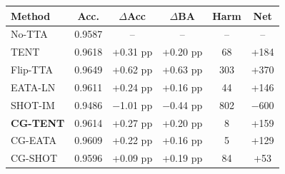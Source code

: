 \begin{tabular}{@{}lccccc@{}}
\toprule
Method & Acc. & $\Delta$Acc & $\Delta$BA & Harm & Net \\
\midrule
No-TTA & 0.9587 & -- & -- & -- & -- \\
TENT & 0.9618 & +0.31 pp & +0.20 pp & 68 & +184 \\
Flip-TTA & 0.9649 & +0.62 pp & +0.63 pp & 303 & +370 \\
EATA-LN & 0.9611 & +0.24 pp & +0.16 pp & 44 & +146 \\
SHOT-IM & 0.9486 & $-$1.01 pp & $-$0.44 pp & 802 & $-$600 \\
\textbf{CG-TENT} & 0.9614 & +0.27 pp & +0.20 pp & 8 & +159 \\
CG-EATA & 0.9609 & +0.22 pp & +0.16 pp & 5 & +129 \\
CG-SHOT & 0.9596 & +0.09 pp & +0.19 pp & 84 & +53 \\
\bottomrule
\end{tabular}